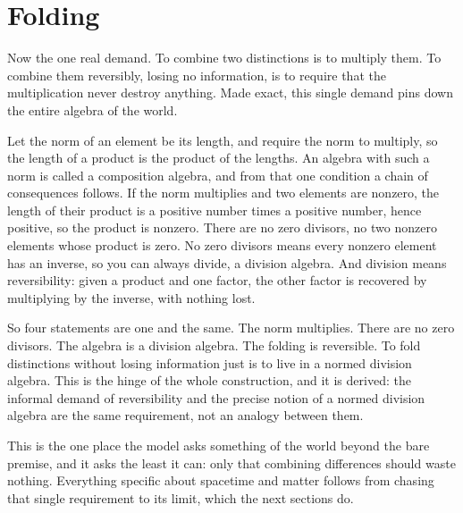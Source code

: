 \section{Folding}

Now the one real demand. To combine two distinctions is to multiply them. To combine them reversibly, losing no information, is to require that the multiplication never destroy anything. Made exact, this single demand pins down the entire algebra of the world.

Let the norm of an element be its length, and require the norm to multiply, so the length of a product is the product of the lengths. An algebra with such a norm is called a composition algebra, and from that one condition a chain of consequences follows. If the norm multiplies and two elements are nonzero, the length of their product is a positive number times a positive number, hence positive, so the product is nonzero. There are no zero divisors, no two nonzero elements whose product is zero. No zero divisors means every nonzero element has an inverse, so you can always divide, a division algebra. And division means reversibility: given a product and one factor, the other factor is recovered by multiplying by the inverse, with nothing lost.

So four statements are one and the same. The norm multiplies. There are no zero divisors. The algebra is a division algebra. The folding is reversible. To fold distinctions without losing information just is to live in a normed division algebra. This is the hinge of the whole construction, and it is derived: the informal demand of reversibility and the precise notion of a normed division algebra are the same requirement, not an analogy between them.

This is the one place the model asks something of the world beyond the bare premise, and it asks the least it can: only that combining differences should waste nothing. Everything specific about spacetime and matter follows from chasing that single requirement to its limit, which the next sections do.
